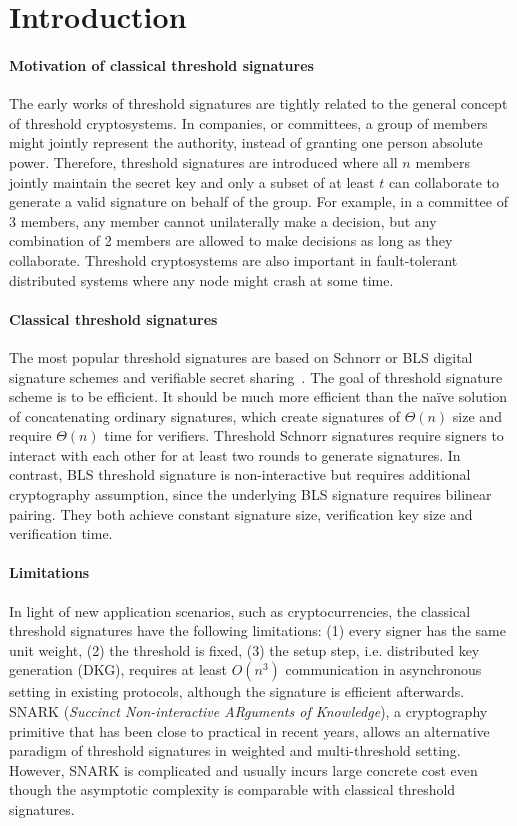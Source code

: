 
\section{Introduction}

\paragraph{Motivation of classical threshold signatures} The early works of threshold signatures are tightly related to the general concept of threshold cryptosystems. In companies, or committees, a group of members might jointly represent the authority, instead of granting one person absolute power. Therefore, threshold signatures are introduced where all $n$ members jointly maintain the secret key and only a subset of at least $t$ can collaborate to generate a valid signature on behalf of the group. For example, in a committee of 3 members, any member cannot unilaterally make a decision, but any combination of 2 members are allowed to make decisions as long as they collaborate. Threshold cryptosystems are also important in fault-tolerant distributed systems where any node might crash at some time. 

\paragraph{Classical threshold signatures} The most popular threshold signatures are based on Schnorr or BLS digital signature schemes and verifiable secret sharing~\cite{DBLP:journals/joc/BonehLS04,DBLP:conf/eurocrypt/Pedersen91a,DBLP:conf/crypto/CritesKM23}. The goal of threshold signature scheme is to be efficient. It should be much more efficient than the na\"ive solution of concatenating ordinary signatures, which create signatures of $\Theta(n)$ size and require $\Theta(n)$ time for verifiers. Threshold Schnorr signatures require signers to interact with each other for at least two rounds to generate signatures. In contrast, BLS threshold signature is non-interactive but requires additional cryptography assumption, since the underlying BLS signature requires bilinear pairing. They both achieve constant signature size, verification key size and verification time. 

\paragraph{Limitations} In light of new application scenarios, such as cryptocurrencies, the classical threshold signatures have the following limitations: (1) every signer has the same unit weight, (2) the threshold is fixed, (3) the setup step, i.e. distributed key generation (DKG), requires at least $O(n^3)$ communication in asynchronous setting in existing protocols, although the signature is efficient afterwards. SNARK (\textit{Succinct Non-interactive ARguments of Knowledge}), a cryptography primitive that has been close to practical in recent years, allows an alternative paradigm of threshold signatures in weighted and multi-threshold setting. However, SNARK is complicated and usually incurs large concrete cost even though the asymptotic complexity is comparable with classical threshold signatures. 

